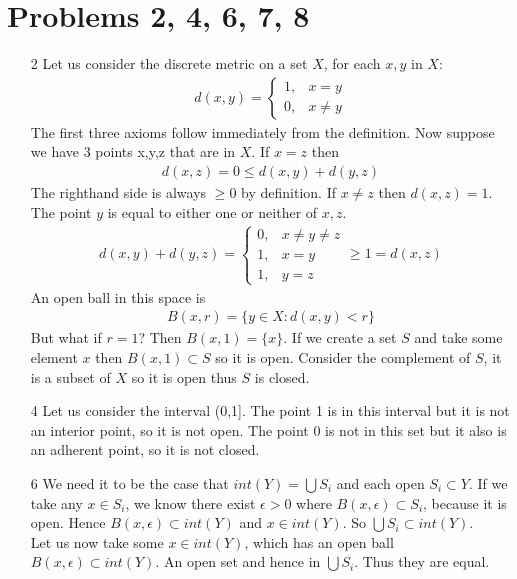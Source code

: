 \documentclass{article}
\begin{document}
  \section{Problems 2, 4, 6, 7, 8}
  \begin{enumerate}
    \item[2]
      Let us consider the discrete metric on a set $X$, for each $x,y$ in $X$:
      \begin{align*}
        d(x,y)=\begin{cases} 1,&x=y\\0,&x\neq y \end{cases}
      \end{align*}
      The first three axioms follow immediately from the definition. Now suppose we have 3 points x,y,z that are in $X$. If $x=z$ then
      \begin{align*}
        d(x,z)=0\leq d(x,y)+d(y,z)
      \end{align*}
      The righthand side is always $\geq0$ by definition. If $x\neq z$ then $d(x,z)=1$. The point $y$ is equal to either one or neither of $x,z$.
      \begin{align*}
        d(x,y)+d(y,z)=\begin{cases} 0,&x\neq y\neq z\\
        1, &x=y\\
        1, &y=z \end{cases}\geq1=d(x,z)
      \end{align*}
      An open ball in this space is
      \begin{align*}
        B(x,r)=\{y\in X: d(x,y)<r\}
      \end{align*}
      But what if $r=1$? Then $B(x,1)=\{x\}$. If we create a set $S$ and take some element $x$ then $B(x,1)\subset S$ so it is open. Consider the complement of $S$, it is a subset of $X$ so it is open thus $S$ is closed.
    \item[4]
      Let us consider the interval (0,1]. The point 1 is in this interval but it is not an interior point, so it is not open. The point 0 is not in this set but it also is an adherent point, so it is not closed.
    \item[6]
      We need it to be the case that $int(Y)=\bigcup S_i$ and each open $S_i\subset Y$. If we take any $x\in S_i$, we know there exist $\epsilon>0$ where $B(x,\epsilon)\subset S_i$, because it is open. Hence $B(x,\epsilon)\subset int(Y)$ and $x\in int(Y)$. So $\bigcup S_i\subset int(Y)$.\\
      Let us now take some $x\in int(Y)$, which has an open ball $B(x,\epsilon)\subset int(Y)$. An open set and hence in $\bigcup S_i$. Thus they are equal.

\end{enumerate}
\end{document}
